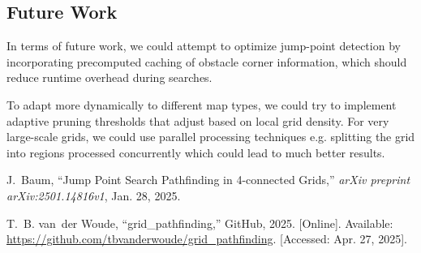 \documentclass[11pt]{article}
\begin{document}
\subsection{Future Work}

In terms of future work, we could attempt to optimize jump-point detection by incorporating precomputed caching of obstacle corner information, which should reduce runtime overhead during searches. 

To adapt more dynamically to different map types, we could try to implement adaptive pruning thresholds that adjust based on local grid density. For very large-scale grids, we could use parallel processing techniques e.g. splitting the grid into regions processed concurrently which could lead to much better results.






\begin{thebibliography}{1}

J.~Baum, “Jump Point Search Pathfinding in 4-connected Grids,” \emph{arXiv preprint arXiv:2501.14816v1}, Jan. 28, 2025.

T.~B. van~der Woude, “grid\_pathfinding,” GitHub, 2025. [Online]. Available: \url{https://github.com/tbvanderwoude/grid_pathfinding}. [Accessed: Apr. 27, 2025].

\end{thebibliography}
\end{document}
